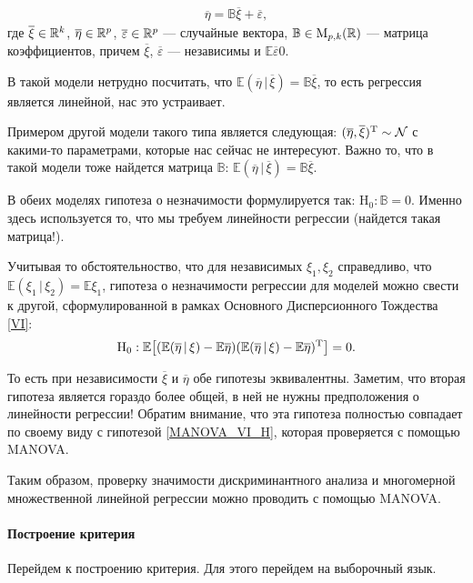 \begin{gather*}
    \overline \eta = \mathbb B \overline \xi + \overline \varepsilon,
\end{gather*}
где $\overline \xi \in \mathbb{R}^k$, $\overline \eta \in \mathbb{R}^p$, $\overline {\varepsilon} \in \mathbb{R}^p$ --- 
случайные вектора, $\mathbb B \in \mathrm M_{p, k}(\mathbb{R})$ --- матрица коэффициентов,
причем $\overline \xi$, $\overline \varepsilon$ --- независимы и $\mathbb E \overline \varepsilon 0$.

В такой модели нетрудно посчитать, что $\mathbb E(\overline \eta \, | \, \overline \xi) = \mathbb B \overline \xi$,
то есть регрессия является линейной, нас это устраивает.

Примером другой модели такого типа является следующая: $(\overline \eta, \overline \xi)^{\mathrm{T}} \sim \mathcal N$ с
какими-то параметрами, которые нас сейчас не интересуют. Важно то, что в такой модели
тоже найдется матрица $\mathbb B$: $\mathbb E(\overline \eta \, | \, \overline \xi) = \mathbb B \overline \xi$.

В обеих моделях гипотеза о незначимости формулируется так: $\mathrm H_0: \mathbb B = 0$.
Именно здесь используется то, что мы требуем линейности регрессии (найдется такая матрица!).

Учитывая то обстоятельноство, что для независимых $\xi_1, \xi_2$ справедливо, что $\mathbb E (\xi_1 \, | \, \xi_2) = \mathbb E\xi_1$,
гипотеза о незначимости регрессии для моделей можно свести к другой, сформулированной в рамках Основного Дисперсионного Тождества
\eqref{VI}:
\begin{gather*}
    \mathrm H_0:
    \mathbb E \big[(\mathbb E (\overline \eta \, | \, \xi) - \mathbb E \overline \eta)
              (\mathbb E (\overline \eta \, | \, \xi) - \mathbb E \overline \eta)^{\mathrm{T}}\big]
    = 0.
\end{gather*}

То есть при независимости $\overline \xi$ и $\overline \eta$ обе гипотезы эквивалентны.
Заметим, что вторая гипотеза является гораздо более общей, в ней не нужны предположения о линейности регрессии!
Обратим внимание, что эта гипотеза полностью совпадает по своему виду с гипотезой \eqref{MANOVA_VI_H},
которая проверяется с помощью MANOVA.

\bigskip
Таким образом, проверку значимости дискриминантного анализа и многомерной множественной линейной регрессии можно проводить с помощью
MANOVA.

\paragraph{Построение критерия}
Перейдем к построению критерия. Для этого перейдем на выборочный язык.

